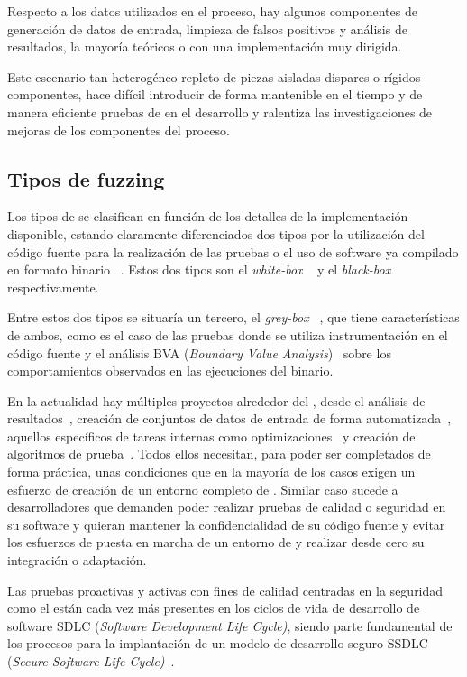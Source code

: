 \documentclass[10pt,conference,a4paper]{IEEEtran}
\begin{document}
Respecto a los datos utilizados en el proceso, hay algunos componentes de generación de datos de entrada, limpieza de falsos positivos y análisis de resultados, la mayoría teóricos o con una implementación muy dirigida.

Este escenario tan heterogéneo repleto de piezas aisladas dispares o rígidos componentes, hace difícil introducir de forma mantenible en el tiempo y de manera eficiente pruebas de {\fz} en el desarrollo y ralentiza las investigaciones de mejoras de los componentes del proceso.

\subsection{Tipos de fuzzing}

Los tipos de {\fz} se clasifican en función de los detalles de la implementación disponible, estando claramente diferenciados dos tipos por la utilización del código fuente para la realización de las pruebas o el uso de software ya compilado en formato binario ~\cite{fuzz_ref_sec-qa_sw}. Estos dos tipos son el \textit{white-box {\fz}}~\cite{fuzz_ref_WF-auto} y el \textit{black-box {\fz}}~\cite{fuzz_ref_BF-testing} respectivamente.

Entre estos dos tipos se situaría un tercero, el \textit{grey-box {\fz}}~\cite{fuzzing_SOA}, que tiene características de ambos, como es el caso de las pruebas donde se utiliza instrumentación en el código fuente\cite{fuzz_ref_WF-general} y el análisis BVA (\textit{Boundary Value Analysis})~\cite{fuzz_ref_BF-bva} sobre los comportamientos observados en las ejecuciones del binario.

En la actualidad hay múltiples proyectos alrededor del {\fz}, desde el análisis de resultados~\cite{fuzz_analisis-resultados}, creación de conjuntos de datos de entrada de forma automatizada~\cite{fuzzing_IN-gen}, aquellos específicos de tareas internas como optimizaciones~\cite{fuzzing_optimizacion} y creación de algoritmos de prueba~\cite{fuzzing_extensionAFL}. Todos ellos necesitan, para poder ser completados de forma práctica, unas condiciones que en la mayoría de los casos exigen un esfuerzo de creación de un entorno completo de {\fz}. Similar caso sucede a desarrolladores que demanden poder realizar pruebas de calidad o seguridad en su software y quieran mantener la confidencialidad de su código fuente y evitar los esfuerzos de puesta en marcha de un entorno de {\fz} y realizar desde cero su integración o adaptación.

Las pruebas proactivas y activas con fines de calidad centradas en la seguridad ~\cite{fuzz_ref_sec-qa_sw} como el {\fz} están cada vez más presentes en los ciclos de vida de desarrollo de software SDLC (\textit{Software Development Life Cycle)}, siendo parte fundamental de los procesos para la implantación de un modelo de desarrollo seguro SSDLC (\textit{Secure Software Life Cycle)}~\cite{SDL_WOW}.
\end{document}
